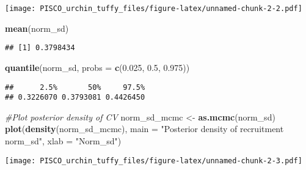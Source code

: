 \documentclass[
]{article}
\newenvironment{Shaded}{\begin{snugshade}}{\end{snugshade}}
\newcommand{\AttributeTok}[1]{\textcolor[rgb]{0.13,0.29,0.53}{#1}}
\newcommand{\CommentTok}[1]{\textcolor[rgb]{0.56,0.35,0.01}{\textit{#1}}}
\newcommand{\FloatTok}[1]{\textcolor[rgb]{0.00,0.00,0.81}{#1}}
\newcommand{\FunctionTok}[1]{\textcolor[rgb]{0.13,0.29,0.53}{\textbf{#1}}}
\newcommand{\NormalTok}[1]{#1}
\newcommand{\OtherTok}[1]{\textcolor[rgb]{0.56,0.35,0.01}{#1}}
\newcommand{\StringTok}[1]{\textcolor[rgb]{0.31,0.60,0.02}{#1}}
\begin{document}
\texttt{[image: PISCO\_urchin\_tuffy\_files/figure-latex/unnamed-chunk-2-2.pdf]}

\begin{Shaded}
\begin{Highlighting}[]
\FunctionTok{mean}\NormalTok{(norm\_sd)}
\end{Highlighting}
\end{Shaded}

\begin{verbatim}
## [1] 0.3798434
\end{verbatim}

\begin{Shaded}
\begin{Highlighting}[]
\FunctionTok{quantile}\NormalTok{(norm\_sd, }\AttributeTok{probs =} \FunctionTok{c}\NormalTok{(}\FloatTok{0.025}\NormalTok{, }\FloatTok{0.5}\NormalTok{, }\FloatTok{0.975}\NormalTok{))}
\end{Highlighting}
\end{Shaded}

\begin{verbatim}
##      2.5%       50%     97.5% 
## 0.3226070 0.3793081 0.4426450
\end{verbatim}

\begin{Shaded}
\begin{Highlighting}[]
\CommentTok{\#Plot posterior density of CV}
\NormalTok{norm\_sd\_mcmc }\OtherTok{\textless{}{-}} \FunctionTok{as.mcmc}\NormalTok{(norm\_sd)}
\FunctionTok{plot}\NormalTok{(}\FunctionTok{density}\NormalTok{(norm\_sd\_mcmc),}
     \AttributeTok{main =} \StringTok{"Posterior density of recruitment norm\_sd"}\NormalTok{,}
     \AttributeTok{xlab =} \StringTok{"Norm\_sd"}\NormalTok{)}
\end{Highlighting}
\end{Shaded}

\texttt{[image: PISCO\_urchin\_tuffy\_files/figure-latex/unnamed-chunk-2-3.pdf]}
\end{document}
